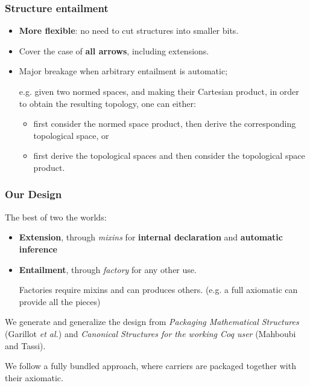 \documentclass[11pt]{beamer}
\begin{document}
\begin{frame}
  \frametitle{Structure entailment}

  \begin{itemize}
  \item \textbf{More flexible}: no need to cut structures into smaller
    bits.
  \item Cover the case of \textbf{all arrows}, including extensions.
    \pause\vfill
  \item Major breakage when arbitrary entailment is automatic;

    e.g. given two normed spaces, and making their Cartesian product, in
    order to obtain the resulting topology, one can either:
    \begin{itemize}
    \item first consider the normed space product, then derive the
      corresponding topological space, or
    \item first derive the topological spaces and then consider the
      topological space product.
    \end{itemize}
  \end{itemize}

\end{frame}

\begin{frame}
  \frametitle{Our Design}

  The best of two the worlds:
  \begin{itemize}
  \item \textbf{Extension}, through \emph{mixins} for \textbf{internal declaration} and
    \textbf{automatic inference}

  \item \textbf{Entailment}, through \emph{factory} for any other use.

    Factories require mixins and can produces others.
    (e.g. a full axiomatic can provide all the pieces)
  \end{itemize}

  \pause  \vfill

  We generate and generalize the design from \textit{Packaging
    Mathematical Structures} (Garillot \textit{et al.}) and
  \textit{Canonical Structures for the working Coq user} (Mahboubi and
  Tassi).

  \pause  \vfill

  We follow a fully bundled approach, where carriers are packaged
  together with their axiomatic.
  
\end{frame}
\end{document}
